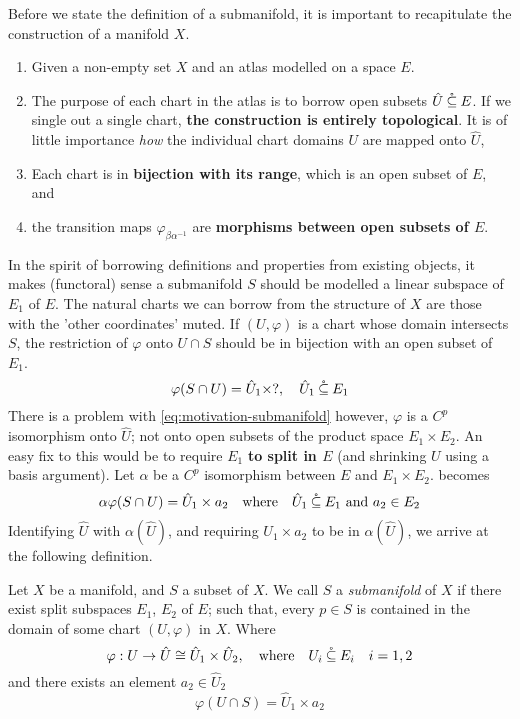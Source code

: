 \documentclass[../main-manifolds.tex]{subfiles}
\begin{document}
%
%
Before we state the definition of a submanifold, it is important to recapitulate the construction of a manifold $X$.
\begin{enumerate}
    \item Given a non-empty set $X$ and an atlas modelled on a space $E$.
    \item The purpose of each chart in the atlas is to borrow open subsets $\hat{U}\:\mathring{\subseteq}\: E$. If we single out a single chart, \textbf{the construction is entirely topological}. It is of little importance \emph{how} the individual chart domains $U$ are mapped onto $\hat{U}$,
    \item Each chart is in \textbf{bijection with its range}, which is an open subset of $E$, and
    \item the transition maps $\varphi_{\beta\alpha^{-1}}$ are \textbf{morphisms between open subsets of $E$}.
\end{enumerate}
In the spirit of borrowing definitions and properties from existing objects, it makes (functoral) sense a submanifold $S$ should be modelled a linear subspace of $E_1$ of $E$. The natural charts we can borrow from the structure of $X$ are those with the 'other coordinates' muted. If $(U,\varphi)$ is a chart whose domain intersects $S$, the restriction of $\varphi$ onto $U\cap S$ should be in bijection with an open subset of $E_1$. 
\begin{equation}\label{eq:motivation-submanifold}
    \varphi(S\cap U) = \hat{U}_1\times ?,\quad \hat{U}_1\:\mathring{\subseteq}\: E_1
\end{equation}
There is a problem with \cref{eq:motivation-submanifold} however, $\varphi$ is a $C^p$ isomorphism onto $\hat{U}$; not onto open subsets of the product space $E_1\times E_2$. An easy fix to this would be to require $E_1$ \textbf{to split in $E$} (and shrinking $U$ using a basis argument). Let $\alpha$ be a $C^p$ isomorphism between $E$ and $E_1\times E_2$.  becomes
\begin{equation}\label{eq:motivation-submanifold-modified}
    \alpha\varphi(S\cap U) = \hat{U}_1\times a_2\qqtext{where} \hat{U}_1\osub E_1 \text{ and }a_2\in E_2
\end{equation}
Identifying $\hat{U}$ with $\alpha(\hat{U})$, and requiring $U_1\times a_2$ to be in $\alpha(\hat{U})$, we arrive at the following definition.
\begin{definition}[Submanifold]
    Let $X$ be a manifold, and $S$ a subset of $X$. We call $S$ a \emph{submanifold} of $X$ if there exist split subspaces $E_1$, $E_2$ of $E$; such that, every $p\in S$ is contained in the domain of some chart $(U,\varphi)$ in $X$. Where
    \begin{equation}\label{eq:submanifold-slice-chart-splits}
        \varphi: U\to \hat{U}\cong \hat{U}_1\times \hat{U}_2,\qqtext{where} U_i\osub E_i\quad i=1,2
    \end{equation}
    and there exists an element $a_2\in \hat{U}_2$
    \begin{equation}\label{eq:submanifold-slice-chart-level-set}
        \varphi(U\cap S) = \hat{U}_1\times a_2
    \end{equation}
\end{definition}
\end{document}
